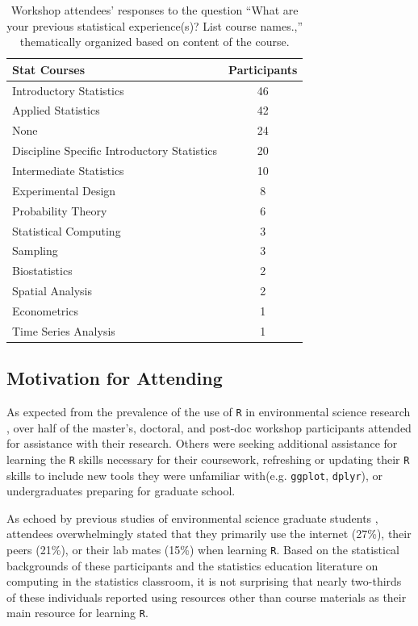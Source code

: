 \documentclass[12pt]{article}
\begin{document}
{
\begin{table}[h!]
    \centering
    \begin{tabular}{lc}
\hline
Stat Courses & Participants \\
\hline
Introductory Statistics & 46 \\
Applied Statistics & 42 \\
None & 24 \\
Discipline Specific Introductory Statistics & 20 \\
Intermediate Statistics & 10 \\
Experimental Design	& 8 \\
Probability Theory	& 6 \\
Statistical Computing & 3 \\
Sampling & 3 \\
Biostatistics & 2 \\
Spatial Analysis & 2 \\
Econometrics & 1 \\
Time Series Analysis & 1 \\
\hline
\end{tabular}
\caption{Workshop attendees' responses to the question ``What are your previous
statistical experience(s)?  List course names.,'' thematically organized based
on content of the course.}
\label{tab:statistics}
\end{table}
}

\subsection{Motivation for Attending} 

\quad As expected from the prevalence of the use of \texttt{R} in environmental
science research \citep{Rpopular, mislan}, over half of the master's, doctoral, 
and post-doc workshop participants attended for assistance with their research. 
Others were seeking additional assistance for learning the \texttt{R} skills
necessary for their coursework, refreshing or updating their \texttt{R}
skills to include new tools they were unfamiliar with(e.g. \texttt{ggplot}, 
\texttt{dplyr}), or undergraduates preparing for graduate school.  

\quad As echoed by previous studies of environmental science graduate students
\citep{datacarpentry, theobold}, attendees overwhelmingly stated that they
primarily use the internet (27\%), their peers (21\%), or their lab mates (15\%) 
when learning \texttt{R}. Based on the statistical backgrounds of these
participants and the statistics education literature on computing in the
statistics classroom, it is not surprising that nearly two-thirds of these 
individuals reported using resources other than course materials as their main 
resource for learning \texttt{R}. 
\end{document}
